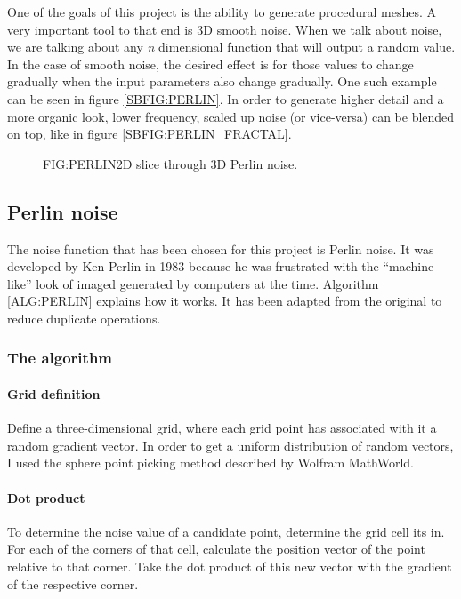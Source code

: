 One of the goals of this project is the ability to generate procedural meshes.
A very important tool to that end is 3D smooth noise.
When we talk about noise,
we are talking about any \textit{n} dimensional function that will output a random value.
In the case of smooth noise,
the desired effect is for those values to change gradually when the input parameters also change gradually.
One such example can be seen in figure \ref{SBFIG:PERLIN}.
In order to generate higher detail and a more organic look,
lower frequency, scaled up noise (or vice-versa) can be blended on top,
like in figure \ref{SBFIG:PERLIN_FRACTAL}.

\begin{figure}[Perlin noise example]{FIG:PERLIN}{2D slice through 3D Perlin noise.}
\end{figure}

\subsection{Perlin noise}

The noise function that has been chosen for this project is Perlin noise.
It was developed by Ken Perlin in 1983 because he was frustrated with the ``machine-like'' look of imaged generated by computers at the time.\cite{making_noise}
Algorithm \ref{ALG:PERLIN} explains how it works.
It has been adapted from the original to reduce duplicate operations.

\subsubsection{The algorithm}

\paragraph{Grid definition}
Define a three-dimensional grid,
where each grid point has associated with it a random gradient vector.
In order to get a uniform distribution of random vectors,
I used the sphere point picking method described by Wolfram MathWorld\cite{sphere_point}.

\paragraph{Dot product}
To determine the noise value of a candidate point,
determine the grid cell its in.
For each of the corners of that cell,
calculate the position vector of the point relative to that corner.
Take the dot product of this new vector with the gradient of the respective corner.

